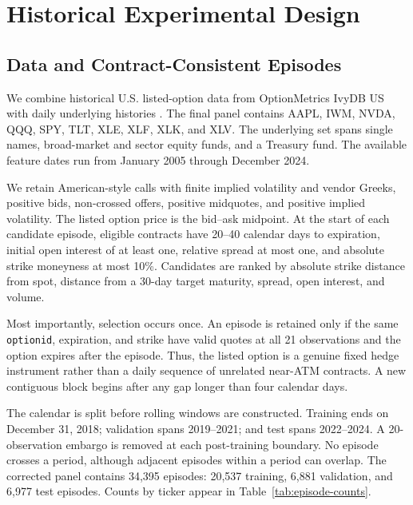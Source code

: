 \documentclass[conference]{IEEEtran}
\begin{document}
\section{Historical Experimental Design}
\label{sec:historical-design}

\subsection{Data and Contract-Consistent Episodes}

We combine historical U.S. listed-option data from OptionMetrics IvyDB US with
daily underlying histories \cite{wrdsOptionMetrics,crspStock}. The final panel
contains AAPL, IWM, NVDA, QQQ, SPY, TLT, XLE, XLF, XLK, and XLV. The underlying
set spans single names, broad-market and sector equity funds, and a Treasury
fund. The available feature dates run from January 2005 through December 2024.

We retain American-style calls with finite implied volatility and vendor
Greeks, positive bids, non-crossed offers, positive midquotes, and positive
implied volatility. The listed option price is the bid--ask midpoint. At the
start of each candidate episode, eligible contracts have 20--40 calendar days
to expiration, initial open interest of at least one, relative spread at most
one, and absolute strike moneyness at most 10\%. Candidates are ranked by
absolute strike distance from spot, distance from a 30-day target maturity,
spread, open interest, and volume.

Most importantly, selection occurs once. An episode is retained only if the
same \texttt{optionid}, expiration, and strike have valid quotes at all 21
observations and the option expires after the episode. Thus, the listed option
is a genuine fixed hedge instrument rather than a daily sequence of unrelated
near-ATM contracts. A new contiguous block begins after any gap longer than
four calendar days.

The calendar is split before rolling windows are constructed. Training ends on
December 31, 2018; validation spans 2019--2021; and test spans 2022--2024. A
20-observation embargo is removed at each post-training boundary. No episode
crosses a period, although adjacent episodes within a period can overlap. The
corrected panel contains 34,395 episodes: 20,537 training, 6,881 validation,
and 6,977 test episodes. Counts by ticker appear in Table~\ref{tab:episode-counts}.

\begin{table}[t]
\centering
\small

\caption{Contract-consistent historical episodes. Each row contains 20
decision intervals and 21 observations. Windows may overlap within a period
but cannot cross the chronological split or embargo.}
\label{tab:episode-counts}
\end{table}
\end{document}
